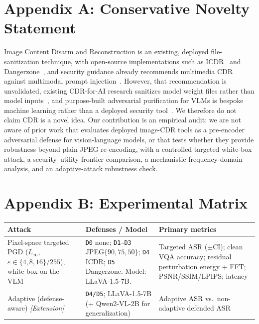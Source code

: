 \documentclass[11pt]{article}
\begin{document}
\section*{Appendix A: Conservative Novelty Statement}
Image Content Disarm and Reconstruction is an existing, deployed
file-sanitization technique, with open-source implementations such as
ICDR~\cite{icdr,openimagecdr} and Dangerzone~\cite{dangerzone}, and security
guidance already recommends multimedia CDR against multimodal prompt
injection~\cite{safm49}. However, that recommendation is unvalidated, existing
CDR-for-AI research sanitizes model weight files rather than model
inputs~\cite{aimodelcdr,ztaicdr}, and purpose-built adversarial purification for
VLMs is bespoke machine learning rather than a deployed security
tool~\cite{nie2022diffpure,clipure2025}. We therefore do not claim CDR is a novel
idea. Our contribution is an empirical audit: we are not aware of prior work that
evaluates deployed image-CDR tools as a pre-encoder adversarial defense for
vision-language models, or that tests whether they provide robustness beyond
plain JPEG re-encoding, with a controlled targeted white-box attack, a
security--utility frontier comparison, a mechanistic frequency-domain analysis,
and an adaptive-attack robustness check.

\section*{Appendix B: Experimental Matrix}
\begin{tabularx}{\textwidth}{@{}Y l Y@{}}
\toprule
\textbf{Attack} & \textbf{Defenses / Model} & \textbf{Primary metrics} \\
\midrule
Pixel-space targeted PGD ($L_\infty$, $\varepsilon\in\{4,8,16\}/255$),
white-box on the VLM~\cite{qi2024visualaaai}
  & \texttt{D0} none; \texttt{D1--D3} JPEG$\{90,75,50\}$; \texttt{D4} ICDR;
    \texttt{D5} Dangerzone. Model: LLaVA-1.5-7B.
  & Targeted ASR ($\pm$CI); clean VQA accuracy; residual perturbation energy +
    FFT; PSNR/SSIM/LPIPS; latency \\
\addlinespace
Adaptive (defense-aware) \emph{[Extension]}
  & \texttt{D4/D5}; LLaVA-1.5-7B ($+$ Qwen2-VL-2B for generalization)
  & Adaptive ASR vs.\ non-adaptive defended ASR \\
\bottomrule
\end{tabularx}
\end{document}
